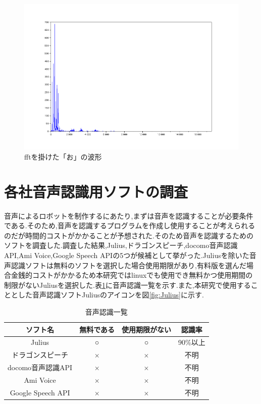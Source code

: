 \documentclass[12pt,oneside]{sotsuken_paper}
\begin{document}
\begin{figure}[htbp]
\begin{center}
\includegraphics[width=120mm]{img/o_fft.png}
\caption{fftを掛けた「お」の波形}
\label{fig:o_fft}
\end{center}
\end{figure}


\section{各社音声認識用ソフトの調査}
音声によるロボットを制作するにあたり,まずは音声を認識することが必要条件である.そのため,音声を認識するプログラムを作成し使用することが考えられるのだが時間的コストがかかることが予想された.そのため音声を認識するためのソフトを調査した.調査した結果,Julius,ドラゴンスピーチ,docomo音声認識API,Ami Voice,Google Speech APIの5つが候補として挙がった.Juliusを除いた音声認識ソフトは無料のソフトを選択した場合使用期限があり,有料版を選んだ場合金銭的コストがかかるため本研究ではlinuxでも使用でき無料かつ使用期間の制限がないJuliusを選択した.表\ref{tab:speechrecog}に音声認識一覧を示す.また,本研究で使用することとした音声認識ソフトJuliusのアイコンを図\ref{fig:Julius}に示す.

\begin{table}[htb]
\begin{center}
\caption{音声認識一覧}
\begin{tabular}{|c|c|c|c|}\hline
ソフト名&無料である&使用期限がない&認識率 \\ \hline
Julius&○&○&90\%以上 \\ \hline
ドラゴンスピーチ & $\times$ & $\times$ & 不明 \\ \hline
docomo音声認識API&$\times$&$\times$&不明\\\hline
Ami Voice&$\times$&$\times$&不明\\\hline
Google Speech API&$\times$&$\times$&不明\\\hline
\end{tabular}
\label{tab:speechrecog}
\end{center}
\end{table}
\end{document}
